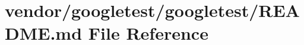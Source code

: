 \hypertarget{vendor_2googletest_2googletest_2README_8md}{}\section{vendor/googletest/googletest/\+R\+E\+A\+D\+ME.md File Reference}
\label{vendor_2googletest_2googletest_2README_8md}
